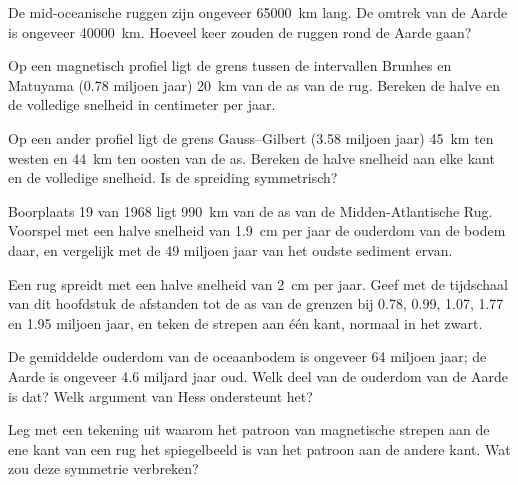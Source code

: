 \begin{exercise}[$\star$]\label{exo:g11:drift-to-spreading:5}
De mid-oceanische ruggen zijn ongeveer \qty{65000}{km} lang. De omtrek van de
Aarde is ongeveer \qty{40000}{km}. Hoeveel keer zouden de ruggen rond de Aarde
gaan?
\end{exercise}

\begin{exercise}[$\star\star$]\label{exo:g11:drift-to-spreading:6}
Op een magnetisch profiel ligt de grens tussen de intervallen Brunhes en Matuyama
(\num{0.78} miljoen jaar) \qty{20}{km} van de as van de rug. Bereken de halve en
de volledige snelheid in centimeter per jaar.
\end{exercise}

\begin{exercise}[$\star\star$]\label{exo:g11:drift-to-spreading:7}
Op een ander profiel ligt de grens Gauss--Gilbert (\num{3.58} miljoen jaar)
\qty{45}{km} ten westen en \qty{44}{km} ten oosten van de as. Bereken de halve
snelheid aan elke kant en de volledige snelheid. Is de spreiding symmetrisch?
\end{exercise}

\begin{exercise}[$\star\star$]\label{exo:g11:drift-to-spreading:8}
Boorplaats 19 van 1968 ligt \qty{990}{km} van de as van de Midden-Atlantische
Rug. Voorspel met een halve snelheid van \qty{1.9}{cm} per jaar de ouderdom van
de bodem daar, en vergelijk met de \num{49} miljoen jaar van het oudste sediment
ervan.
\end{exercise}

\begin{exercise}[$\star\star$]\label{exo:g11:drift-to-spreading:9}
Een rug spreidt met een halve snelheid van \qty{2}{cm} per jaar. Geef met de
tijdschaal van dit hoofdstuk de afstanden tot de as van de grenzen bij 0.78,
0.99, 1.07, 1.77 en 1.95 miljoen jaar, en teken de strepen aan één kant, normaal
in het zwart.
\end{exercise}

\begin{exercise}[$\star\star$]\label{exo:g11:drift-to-spreading:10}
De gemiddelde ouderdom van de oceaanbodem is ongeveer \num{64} miljoen jaar; de
Aarde is ongeveer \num{4.6} miljard jaar oud. Welk deel van de ouderdom van de
Aarde is dat? Welk argument van Hess ondersteunt het?
\end{exercise}

\begin{exercise}[$\star\star$]\label{exo:g11:drift-to-spreading:11}
Leg met een tekening uit waarom het patroon van magnetische strepen aan de ene
kant van een rug het spiegelbeeld is van het patroon aan de andere kant. Wat zou
deze symmetrie verbreken?
\end{exercise}


